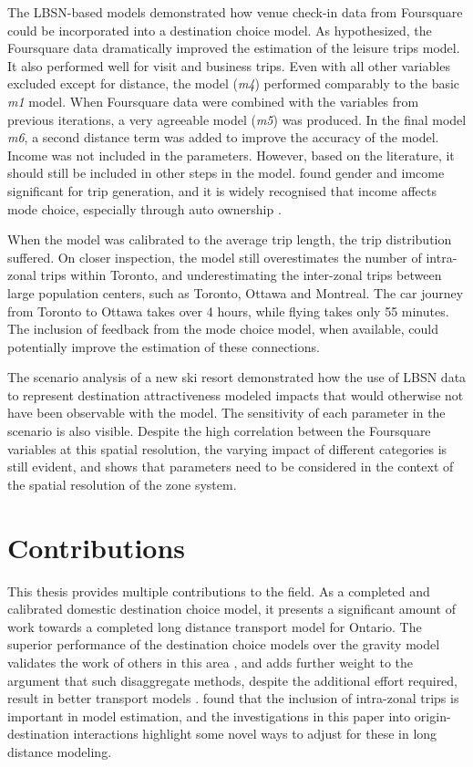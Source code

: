 The LBSN-based models demonstrated how venue check-in data from Foursquare could be incorporated into a destination choice model. As hypothesized, the Foursquare data dramatically improved the estimation of the leisure trips model. It also performed well for visit and business trips. Even with all other variables excluded except for distance, the model (\textit{m4}) performed comparably to the basic \textit{m1} model. When Foursquare data were combined with the variables from previous iterations, a very agreeable model (\textit{m5}) was produced. In the final model \textit{m6}, a second distance term was added to improve the accuracy of the model.
Income was not included in the parameters. However, based on the literature, it should still be included in other steps in the model. \textcite{limtanakool2006participation} found gender and imcome significant for trip generation, and it is widely recognised that income affects mode choice, especially through auto ownership \parencite{ben1974some, miller1998urban, raphael2002car}.

When the model was calibrated to the average trip length, the trip distribution suffered. On closer inspection, the model still overestimates the number of intra-zonal trips within Toronto, and underestimating the inter-zonal trips between large population centers, such as Toronto, Ottawa and Montreal. The car journey from Toronto to Ottawa takes over 4 hours, while flying takes only 55 minutes. The inclusion of feedback from the mode choice model, when available, could potentially improve the estimation of these connections.

The scenario analysis of a new ski resort demonstrated how the use of LBSN data to represent destination attractiveness modeled impacts that would otherwise not have been observable with the model. The sensitivity of each parameter in the scenario is also visible. Despite the high correlation between the Foursquare variables at this spatial resolution, the varying impact of different categories is still evident, and shows that parameters need to be considered in the context of the spatial resolution of the zone system. 

\section{Contributions}
This thesis provides multiple contributions to the field. As a completed and calibrated domestic destination choice model, it presents a significant amount of work towards a completed long distance transport model for Ontario. The superior performance of the destination choice models over the gravity model validates the work of others in this area \parencite{Mishra13}, 
and adds further weight to the argument that such disaggregate methods, despite the additional effort required, result in better transport models \parencite{sbayti2010best, lemp2007aggregate}. \textcite{bhatta2011intrazonal} found that the inclusion of intra-zonal trips is important in model estimation, and the investigations in this paper into origin-destination interactions highlight some novel ways to adjust for these in long distance modeling.

